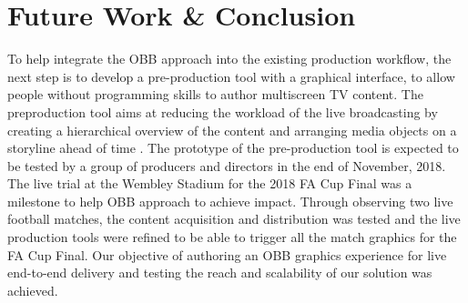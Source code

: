 \documentclass[sigchi-a, authorversion]{acmart}
\begin{document}
\section{Future Work \& Conclusion}
To help integrate the OBB approach into the existing
production workflow, the next step is to develop a pre-production tool with a
graphical interface, to allow people without programming skills to author
multiscreen TV content. The preproduction tool aims at reducing the workload of
the live broadcasting by creating a hierarchical overview of the content and
arranging media objects on a storyline ahead of time \cite{Li:2018_TVX}. The
prototype of the pre-production tool is expected to be tested by a group of
producers and directors in the end of November, 2018. The live trial at the Wembley Stadium for the 2018 FA Cup Final was a
milestone to help OBB approach to achieve impact. Through observing two live football matches, the
content acquisition and distribution was tested and the live production tools
were refined to be able to trigger all the match graphics for the FA Cup Final.
Our objective of authoring an OBB graphics experience for live end-to-end
delivery and testing the reach and scalability of our solution was achieved.



\end{document}
